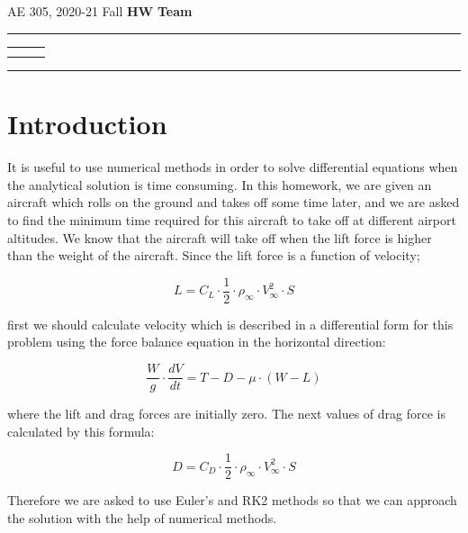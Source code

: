 \documentclass[letterpaper,12pt]{article}
\begin{document}
\begin{center}
AE 305, 2020-21 Fall \hfill \textbf{HW \HWno} \hfill \textbf{Team \TeamNo} \\
\noindent\rule{\textwidth}{0.4pt}
\begin{tabular}{p{} | p{} | p{} }
	\AuthorOneName&\AuthorTwoName&\AuthorThreeName\\
	\textit{\AuthorOneID}&\textit{\AuthorTwoID}&\textit{\AuthorThreeID}
\end{tabular}
\noindent\rule{\textwidth}{0.4pt}
\end{center}


\section{Introduction}

It is useful to use numerical methods in order to solve differential equations when
the analytical solution is time consuming. In this homework, we are given an aircraft
which rolls on the ground and takes off some time later, and we are asked to find
the minimum time required for this aircraft to take off at different airport altitudes.
We know that the aircraft will take off when the lift force is higher than the weight of
the aircraft. Since the lift force is a function of velocity;

\begin{equation}
        L = C_L \cdot \frac{1}{2} \cdot \rho_{\infty} \cdot V_{\infty}^{2} \cdot S
\end{equation}

first we should calculate velocity which is described in a differential form for
this problem using the force balance equation in the horizontal direction:

\begin{equation}
        \frac{W}{g} \cdot \frac{dV}{dt} = T - D - \mu \cdot (W - L)
\end{equation}

where the lift and drag forces are initially zero. The next values of drag force is calculated
by this formula:

\begin{equation}
        D = C_D \cdot \frac{1}{2} \cdot \rho_{\infty} \cdot V_{\infty}^{2} \cdot S
\end{equation}

Therefore we are asked to use Euler's and RK2 methods so that we can approach the
solution with the help of numerical methods.
\end{document}
